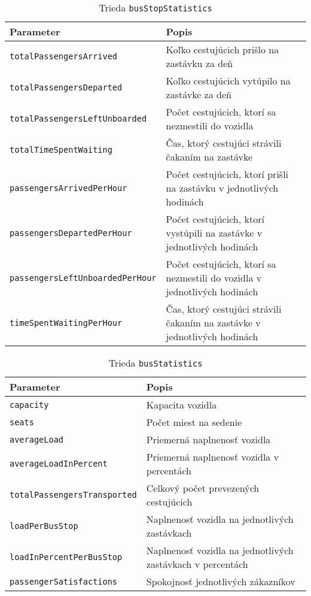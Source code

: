 \begin{table}[h]\label{tab:busStopStatistics_class}
  \centering
  \begin{tabularx}{\textwidth}{|l|X|}
    \hline
    \textbf{Parameter} & \textbf{Popis} \\ \hline
    \texttt{totalPassengersArrived} & Koľko cestujúcich prišlo na zastávku za deň \\ \hline
    \texttt{totalPassengersDeparted} & Koľko cestujúcich vytúpilo na zastávke za deň \\ \hline
    \texttt{totalPassengersLeftUnboarded} & Počet cestujúcich, ktorí sa nezmestili do vozidla \\ \hline
    \texttt{totalTimeSpentWaiting} & Čas, ktorý cestujúci strávili čakaním na zastávke \\ \hline
    \texttt{passengersArrivedPerHour} & Počet cestujúcich, ktorí prišli na zastávku v jednotlivých hodinách \\ \hline
    \texttt{passengersDepartedPerHour} & Počet cestujúcich, ktorí vystúpili na zastávke v jednotlivých hodinách \\ \hline
    \texttt{passengersLeftUnboardedPerHour} & Počet cestujúcich, ktorí sa nezmestili do vozidla v jednotlivých hodinách \\ \hline
    \texttt{timeSpentWaitingPerHour} & Čas, ktorý cestujúci strávili čakaním na zastávke v jednotlivých hodinách \\ \hline
  \end{tabularx}
  \caption{Trieda \texttt{busStopStatistics}}
\end{table}

\begin{table}[h]\label{tab:busStatistics_class}
  \centering
  \begin{tabularx}{\textwidth}{|l|X|}
    \hline
    \textbf{Parameter} & \textbf{Popis} \\ \hline
    \texttt{capacity} & Kapacita vozidla \\ \hline
    \texttt{seats} & Počet miest na sedenie \\ \hline
    \texttt{averageLoad} & Priemerná naplnenosť vozidla \\ \hline
    \texttt{averageLoadInPercent} & Priemerná naplnenosť vozidla v percentách \\ \hline
    \texttt{totalPassengersTransported} & Celkový počet prevezených cestujúcich \\ \hline
    \texttt{loadPerBusStop} & Naplnenosť vozidla na jednotlivých zastávkach \\ \hline
    \texttt{loadInPercentPerBusStop} & Naplnenosť vozidla na jednotlivých zastávkach v percentách \\ \hline
    \texttt{passengerSatisfactions} & Spokojnosť jednotlivých zákazníkov \\ \hline
  \end{tabularx}
  \caption{Trieda \texttt{busStatistics}}
\end{table}


